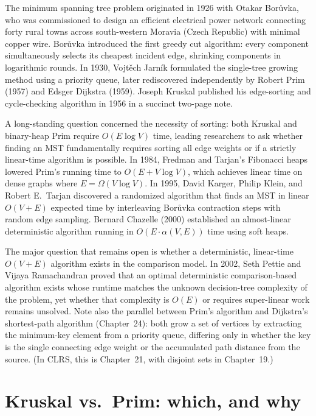 \begin{historybox}
The minimum spanning tree problem originated in 1926 with Otakar Bor\r{u}vka, who was commissioned to design an efficient electrical power network connecting forty rural towns across south-western Moravia (Czech Republic) with minimal copper wire. Bor\r{u}vka introduced the first greedy cut algorithm: every component simultaneously selects its cheapest incident edge, shrinking components in logarithmic rounds. In 1930, Vojt\v{e}ch Jarn\'ik formulated the single-tree growing method using a priority queue, later rediscovered independently by Robert Prim (1957) and Edsger Dijkstra (1959). Joseph Kruskal published his edge-sorting and cycle-checking algorithm in 1956 in a succinct two-page note.

A long-standing question concerned the necessity of sorting: both Kruskal and binary-heap Prim require $O(E \log V)$ time, leading researchers to ask whether finding an MST fundamentally requires sorting all edge weights or if a strictly linear-time algorithm is possible. In 1984, Fredman and Tarjan's Fibonacci heaps lowered Prim's running time to $O(E + V \log V)$, which achieves linear time on dense graphs where $E = \Omega(V \log V)$. In 1995, David Karger, Philip Klein, and Robert E.\ Tarjan discovered a randomized algorithm that finds an MST in linear $O(V+E)$ expected time by interleaving Bor\r{u}vka contraction steps with random edge sampling. Bernard Chazelle (2000) established an almost-linear deterministic algorithm running in $O(E \cdot \alpha(V, E))$ time using soft heaps.

The major question that remains open is whether a deterministic, linear-time $O(V+E)$ algorithm exists in the comparison model. In 2002, Seth Pettie and Vijaya Ramachandran proved that an optimal deterministic comparison-based algorithm exists whose runtime matches the unknown decision-tree complexity of the problem, yet whether that complexity is $O(E)$ or requires super-linear work remains unsolved. Note also the parallel between Prim's algorithm and Dijkstra's shortest-path algorithm (Chapter~24): both grow a set of vertices by extracting the minimum-key element from a priority queue, differing only in whether the key is the single connecting edge weight or the accumulated path distance from the source. (In CLRS, this is Chapter~21, with disjoint sets in Chapter~19.)
\end{historybox}

\section{Kruskal vs.\ Prim: which, and why}

